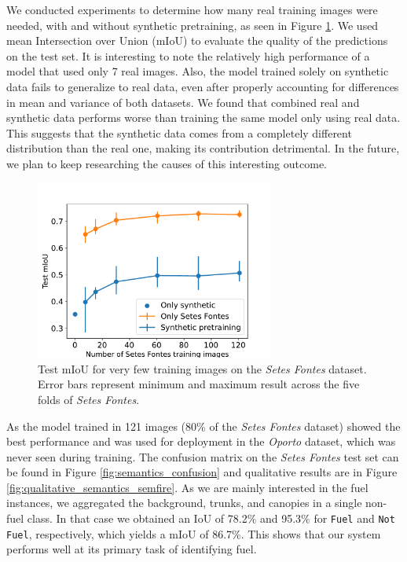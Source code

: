 We conducted experiments to determine how many real training images were needed, with and without synthetic pretraining, as seen in Figure \ref{fig:results:semantic-size-pretraining}. We used mean Intersection over Union (mIoU) to evaluate the quality of the predictions on the test set. It is interesting to note the relatively high performance of a model that used only 7 real images. Also, the model trained solely on synthetic data fails to generalize to real data, even after properly accounting for differences in mean and variance of both datasets. We found that combined real and synthetic data performs worse than training the same model only using real data. This suggests that the synthetic data comes from a completely different distribution than the real one, making its contribution detrimental. In the future, we plan to keep researching the causes of this interesting outcome.

\begin{figure}
    \centering
    \includegraphics[width=0.7\textwidth]{figs/results/semantic_segmentation/synthetic_experiments_mious.pdf}
    \caption{Test mIoU for very few training images on the \textit{Setes Fontes} dataset.
    Error bars represent minimum and maximum result across the five folds of \textit{Setes Fontes}.}
    \label{fig:results:semantic-size-pretraining}
\end{figure}

As the model trained in 121 images ($80\%$ of the \textit{Setes Fontes} dataset) showed the best performance and was used for deployment in the \textit{Oporto} dataset, which was never seen during training.
The confusion matrix on the \textit{Setes Fontes} test set can be found in Figure \ref{fig:semantics_confusion} and qualitative results are in Figure \ref{fig:qualitative_semantics_semfire}. As we are mainly interested in the fuel instances, we aggregated the background, trunks, and canopies in a single non-fuel class. In that case we obtained an IoU of 78.2\% and 95.3\% for \texttt{Fuel} and \texttt{Not Fuel}, respectively, which yields a mIoU of 86.7\%. This shows that our system performs well at its primary task of identifying fuel.



